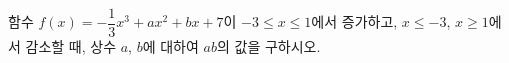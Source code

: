 함수 $f(x)=-\dfrac{1}{3}x^3+ax^2+bx+7$이 $-3\le x\le 1$에서 증가하고, $x\le-3$, $x\ge 1$에서 감소할 때, 상수 $a$, $b$에 대하여 $ab$의 값을 구하시오.
